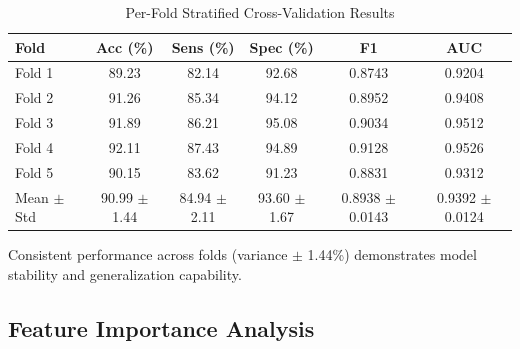 \documentclass[conference]{IEEEtran}
\begin{document}
\begin{table}[H]
\centering
\caption{Per-Fold Stratified Cross-Validation Results}
\begin{tabular}{lccccc}
\toprule
\textbf{Fold} & \textbf{Acc (\%)} & \textbf{Sens (\%)} & \textbf{Spec (\%)} & \textbf{F1} & \textbf{AUC} \\
\midrule
Fold 1 & 89.23 & 82.14 & 92.68 & 0.8743 & 0.9204 \\
Fold 2 & 91.26 & 85.34 & 94.12 & 0.8952 & 0.9408 \\
Fold 3 & 91.89 & 86.21 & 95.08 & 0.9034 & 0.9512 \\
Fold 4 & 92.11 & 87.43 & 94.89 & 0.9128 & 0.9526 \\
Fold 5 & 90.15 & 83.62 & 91.23 & 0.8831 & 0.9312 \\
\midrule
Mean $\pm$ Std & 90.99 $\pm$ 1.44 & 84.94 $\pm$ 2.11 & 93.60 $\pm$ 1.67 & 0.8938 $\pm$ 0.0143 & 0.9392 $\pm$ 0.0124 \\
\bottomrule
\end{tabular}
\label{tab:perfold}
\end{table}

Consistent performance across folds (variance $\pm$ 1.44\%) demonstrates model stability and generalization capability.

\subsection{Feature Importance Analysis}
\end{document}
